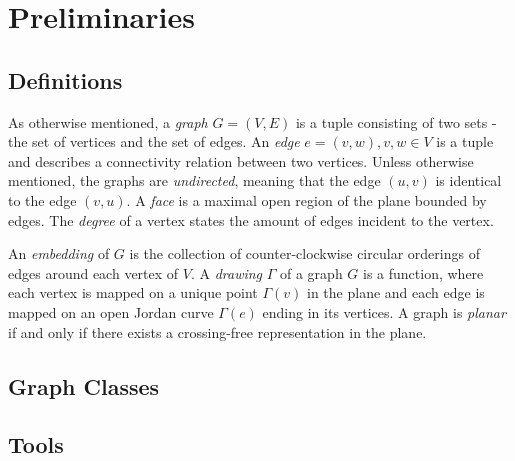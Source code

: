 \section{Preliminaries}
\subsection{Definitions}
As otherwise mentioned, a \emph{graph} $G=(V,E)$ is a tuple consisting of two sets - the set of vertices and the set of edges. An \emph{edge} $e = (v,w), v,w \in V$ is a tuple and describes a connectivity relation between two vertices.
Unless otherwise mentioned, the graphs are \emph{undirected}, meaning that the edge $(u,v)$ is identical to the edge $(v,u)$.
A \emph{face} is a maximal open region of the plane bounded by edges. 
The \emph{degree} of a vertex states the amount of edges incident to the vertex.

An \emph{embedding} of $G$ is the collection of counter-clockwise circular orderings of edges around each vertex of $V$.
A \emph{drawing} $\Gamma$ of a graph $G$ is a function, where each vertex is mapped on a unique point $\Gamma(v)$ in the plane and each edge is mapped on an open Jordan curve $\Gamma(e)$ ending in its vertices.
A graph is \emph{planar} if and only if there exists a crossing-free representation in the plane. 
\cite[Page 100]{DBLP:books/daglib/0023376}







\subsection{Graph Classes}





\subsection{Tools}

